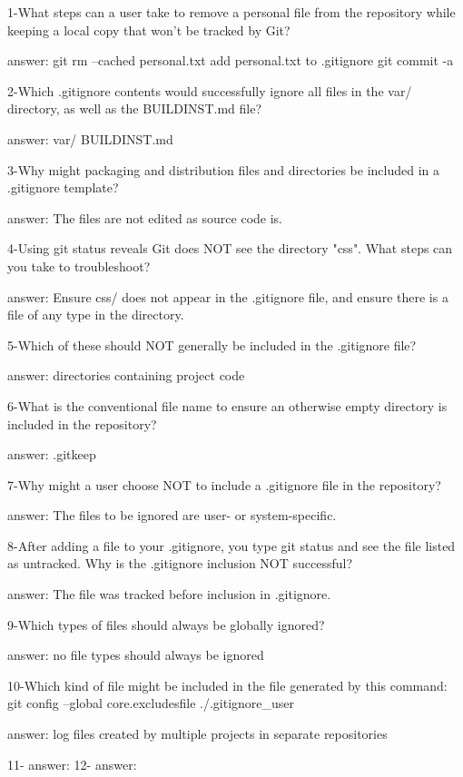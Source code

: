 1-What steps can a user take to remove a personal file from the repository while keeping a local copy that won't be tracked by Git?

answer: git rm --cached personal.txt add personal.txt to .gitignore git commit -a

2-Which .gitignore contents would successfully ignore all files in the var/ directory, as well as the BUILDINST.md file?

answer: 
var/
BUILDINST.md

3-Why might packaging and distribution files and directories be included in a .gitignore template?

answer: The files are not edited as source code is.

4-Using git status reveals Git does NOT see the directory "css". What steps can you take to troubleshoot?

answer: Ensure css/ does not appear in the .gitignore file, and ensure there is a file of any type in the directory.

5-Which of these should NOT generally be included in the .gitignore file?

answer: directories containing project code

6-What is the conventional file name to ensure an otherwise empty directory is included in the repository?

answer: .gitkeep

7-Why might a user choose NOT to include a .gitignore file in the repository?

answer: The files to be ignored are user- or system-specific.

8-After adding a file to your .gitignore, you type git status and see the file listed as untracked. Why is the .gitignore inclusion NOT successful?

answer: The file was tracked before inclusion in .gitignore.

9-Which types of files should always be globally ignored?

answer: no file types should always be ignored

10-Which kind of file might be included in the file generated by this command: git config --global core.excludesfile ./.gitignore_user

answer: log files created by multiple projects in separate repositories

11-
answer: 
12-
answer: